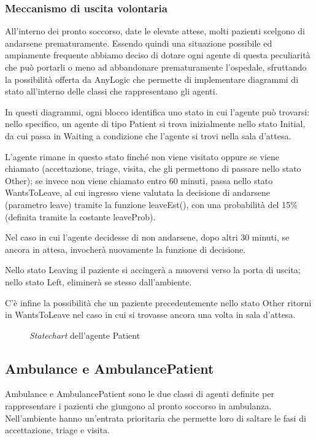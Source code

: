 \subsubsection{Meccanismo di uscita volontaria}
All’interno dei pronto soccorso, date le elevate attese, molti pazienti scelgono di andarsene prematuramente. Essendo quindi una situazione possibile ed ampiamente frequente abbiamo deciso di dotare ogni agente di questa peculiarità che può portarli o meno ad abbandonare prematuramente l’ospedale, sfruttando la possibilità offerta da AnyLogic che permette di implementare diagrammi di stato all'interno delle classi che rappresentano gli agenti. 

In questi diagrammi, ogni blocco identifica uno stato in cui l’agente può trovarsi: nello specifico, un agente di tipo Patient si trova inizialmente nello stato Initial, da cui passa in Waiting a condizione che l’agente si trovi nella sala d’attesa. 

L’agente rimane in questo stato finché non viene visitato oppure se viene chiamato (accettazione, triage, visita, che gli permettono di passare nello stato Other); se invece non viene chiamato entro 60 minuti, passa nello stato WantsToLeave, al cui ingresso viene valutata la decisione di andarsene (parametro leave) tramite la funzione leaveEst(), con una probabilità del 15\% (definita tramite la costante leaveProb). 

Nel caso in cui l’agente decidesse di non andarsene, dopo altri 30 minuti, se ancora in attesa, invocherà nuovamente la funzione di decisione.  

Nello stato Leaving il paziente si accingerà a muoversi verso la porta di uscita; nello stato Left, eliminerà se stesso dall’ambiente. 

C’è infine la possibilità che un paziente precedentemente nello stato Other ritorni in WantsToLeave nel caso in cui si trovasse ancora una volta in sala d’attesa. 

\begin{figure}[!htb]
    \centering
    \caption{\textit{Statechart} dell'agente Patient}
    \label{fig:statechart}
\end{figure}

\subsection{Ambulance e AmbulancePatient}

Ambulance e AmbulancePatient sono le due classi di agenti definite per rappresentare i pazienti che giungono al pronto soccorso in ambulanza. Nell'ambiente hanno un'entrata prioritaria che permette loro di saltare le fasi di accettazione, triage e visita. 

